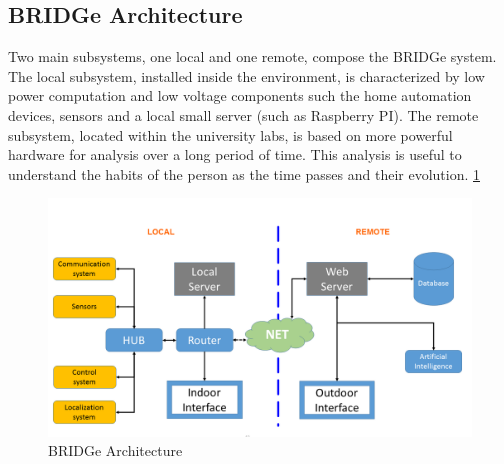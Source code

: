 \subsection{BRIDGe Architecture}
Two main subsystems, one local and one remote, compose the BRIDGe system. The local subsystem, installed inside the environment, is characterized by low power computation and low voltage components such the home automation devices, sensors and a local small server (such as Raspberry PI).
The remote subsystem, located within the university labs, is based on more powerful hardware for analysis over a long period of time. This analysis is useful to understand the habits of the person as the time passes and their evolution. \ref{fig1.1}
\begin{figure}[ht!]
\centering
\includegraphics[width=140mm]{figures/ch1/fig7.png}
\caption{BRIDGe Architecture \label{overflow}}
\label{fig1.1}
\end{figure}